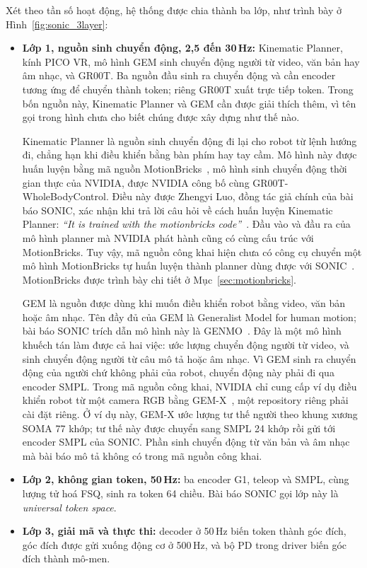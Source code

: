 \documentclass[12pt,a4paper,oneside]{report}
\begin{document}
Xét theo tần số hoạt động, hệ thống được chia thành ba lớp, như trình bày ở Hình~\ref{fig:sonic_3layer}:
\begin{itemize}
\item \textbf{Lớp 1, nguồn sinh chuyển động, 2,5 đến 30\,Hz:} Kinematic Planner, kính PICO VR, mô hình GEM sinh chuyển động người từ video, văn bản hay âm nhạc, và GR00T. Ba nguồn đầu sinh ra chuyển động và cần encoder tương ứng để chuyển thành token; riêng GR00T xuất trực tiếp token. Trong bốn nguồn này, Kinematic Planner và GEM cần được giải thích thêm, vì tên gọi trong hình chưa cho biết chúng được xây dựng như thế nào.

\smallskip
Kinematic Planner là nguồn sinh chuyển động đi lại cho robot từ lệnh hướng đi, chẳng hạn khi điều khiển bằng bàn phím hay tay cầm. Mô hình này được huấn luyện bằng mã nguồn MotionBricks~\cite{motionbricks}, mô hình sinh chuyển động thời gian thực của NVIDIA, được NVIDIA công bố cùng GR00T-WholeBodyControl. Điều này được Zhengyi Luo, đồng tác giả chính của bài báo SONIC, xác nhận khi trả lời câu hỏi về cách huấn luyện Kinematic Planner: \emph{``It is trained with the motionbricks code''}~\cite{issue192}. Đầu vào và đầu ra của mô hình planner mà NVIDIA phát hành cũng có cùng cấu trúc với MotionBricks. Tuy vậy, mã nguồn công khai hiện chưa có công cụ chuyển một mô hình MotionBricks tự huấn luyện thành planner dùng được với SONIC~\cite{issue207}. MotionBricks được trình bày chi tiết ở Mục~\ref{sec:motionbricks}.

\smallskip
GEM là nguồn được dùng khi muốn điều khiển robot bằng video, văn bản hoặc âm nhạc. Tên đầy đủ của GEM là Generalist Model for human motion; bài báo SONIC trích dẫn mô hình này là GENMO~\cite{genmo}. Đây là một mô hình khuếch tán làm được cả hai việc: ước lượng chuyển động người từ video, và sinh chuyển động người từ câu mô tả hoặc âm nhạc. Vì GEM sinh ra chuyển động của người chứ không phải của robot, chuyển động này phải đi qua encoder SMPL. Trong mã nguồn công khai, NVIDIA chỉ cung cấp ví dụ điều khiển robot từ một camera RGB bằng GEM-X~\cite{gemx}, một repository riêng phải cài đặt riêng. Ở ví dụ này, GEM-X ước lượng tư thế người theo khung xương SOMA 77 khớp; tư thế này được chuyển sang SMPL 24 khớp rồi gửi tới encoder SMPL của SONIC. Phần sinh chuyển động từ văn bản và âm nhạc mà bài báo mô tả không có trong mã nguồn công khai.
\item \textbf{Lớp 2, không gian token, 50\,Hz:} ba encoder G1, teleop và SMPL, cùng lượng tử hoá FSQ, sinh ra token 64 chiều. Bài báo SONIC gọi lớp này là \emph{universal token space}.
\item \textbf{Lớp 3, giải mã và thực thi:} decoder ở 50\,Hz biến token thành góc đích, góc đích được gửi xuống động cơ ở 500\,Hz, và bộ PD trong driver biến góc đích thành mô-men.


\end{itemize}
\end{document}
